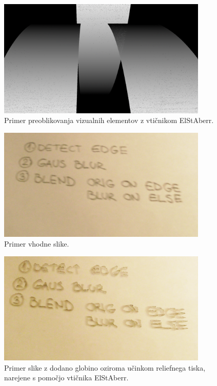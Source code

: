 \documentclass[a4paper, 12pt]{book}
\begin{document}
\begin{figure}[H]
\begin{center}
\includegraphics[width=10cm]{img/test2ELSTABERR.PNG}
\end{center}
\caption{Primer preoblikovanja vizualnih elementov z vtičnikom ElStAberr.}
\label{demo1}
\end{figure}


\begin{figure}[H]
\begin{center}
\includegraphics[width=10cm]{img/todo.PNG}
\end{center}
\caption{Primer vhodne slike.}
\label{orig1}
\end{figure}

\begin{figure}[H]
\begin{center}
\includegraphics[width=10cm]{img/todoELSTABERR.PNG}
\end{center}
\caption{Primer slike z dodano globino oziroma učinkom reliefnega tiska, narejene s pomočjo vtičnika ElStAberr.}
\label{demo1}
\end{figure}
\end{document}
